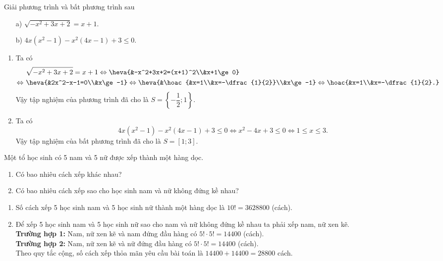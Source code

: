 
\begin{bt}%
Giải phương trình và bất phương trình sau
\begin{enumerate}
\item[a)] $\sqrt{-x^2+3x+2}=x+1$.
\item[b)] $4x(x^2-1)-x^2(4x-1)+3\le0$.
\end{enumerate}
\loigiai
{
\begin{enumerate}
\item Ta có
\[\begin{aligned}
& \ \sqrt{-x^2+3x+2}=x+1\Leftrightarrow\heva{&-x^2+3x+2=(x+1)^2\\&x+1\ge0} \\
\Leftrightarrow & \ \heva{&2x^2-x-1=0\\&x\ge-1}\Leftrightarrow\heva{&\hoac{&x=1\\&x=-\dfrac{1}{2}}\\&x\ge-1} \Leftrightarrow \hoac{&x=1\\&x=-\dfrac{1}{2}.}
\end{aligned}\]
Vậy tập nghiệm của phương trình đã cho là $S=\left\{-\dfrac{1}{2};1\right\}$.
\item Ta có
\[4x(x^2-1)-x^2(4x-1)+3\le0\Leftrightarrow x^2-4x+3\le0\Leftrightarrow 1\le x\le3.\]
Vậy tập nghiệm của bất phương trình đã cho là $S=[1;3]$.
\end{enumerate}
}
\end{bt}

\begin{bt}%
Một tổ học sinh có 5 nam và 5 nữ được xếp thành một hàng dọc.
\begin{enumerate}
\item Có bao nhiêu cách xếp khác nhau?
\item Có bao nhiêu cách xếp sao cho học sinh nam và nữ không đứng kề nhau?
\end{enumerate}
\loigiai
{
\begin{enumerate}
\item Số cách xếp 5 học sinh nam và 5 học sinh nữ thành một hàng dọc là $10!=3628800$ (cách).
\item Để xếp 5 học sinh nam và 5 học sinh nữ sao cho nam và nữ không đứng kề nhau ta phải xếp nam, nữ xen kẽ.\\
\textbf{Trường hợp 1:} Nam, nữ xen kẽ và nam đứng đầu hàng có $5!\cdot5!=14400$ (cách).\\
\textbf{Trường hợp 2:} Nam, nữ xen kẽ và nữ đứng đầu hàng có $5!\cdot5!=14400$ (cách).\\
Theo quy tắc cộng, số cách xếp thỏa mãn yêu cầu bài toán là $14400+14400=28800$ cách.
\end{enumerate}
}
\end{bt}


